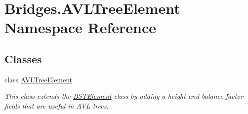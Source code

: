 \hypertarget{namespace_bridges_1_1_a_v_l_tree_element}{}\section{Bridges.\+A\+V\+L\+Tree\+Element Namespace Reference}
\label{namespace_bridges_1_1_a_v_l_tree_element}
\subsection*{Classes}
\begin{DoxyCompactItemize}
\item 
class \hyperlink{class_bridges_1_1_a_v_l_tree_element_1_1_a_v_l_tree_element}{A\+V\+L\+Tree\+Element}
\begin{DoxyCompactList}\small\item\em This class extends the \hyperlink{namespace_bridges_1_1_b_s_t_element}{B\+S\+T\+Element} class by adding a height and balance factor fields that are useful in A\+V\+L trees. \end{DoxyCompactList}\end{DoxyCompactItemize}
